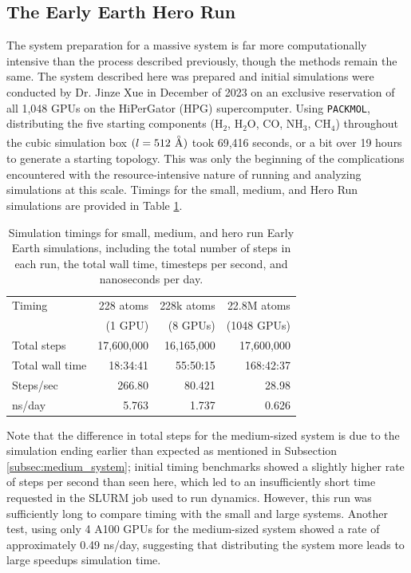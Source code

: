 \subsection{The Early Earth Hero Run}
\label{subsec:hero_run_simulation}

The system preparation for a massive system is far more computationally intensive than the process described previously, though the methods remain the same.
The system described here was prepared and initial simulations were conducted by Dr. Jinze Xue in December of 2023 on an exclusive reservation of all 1,048 GPUs on the HiPerGator (HPG) supercomputer.
Using \verb|PACKMOL|, distributing the five starting components ($\text{H}_2$, $\text{H}_2\text{O}$, CO, $\text{NH}_3$, $\text{CH}_4$) throughout the cubic simulation box $(l=512 \ \angstrom)$ took 69,416 seconds, or a bit over 19 hours to generate a starting topology.
This was only the beginning of the complications encountered with the resource-intensive nature of running and analyzing simulations at this scale. 
Timings for the small, medium, and Hero Run simulations are provided in Table \ref{tbl:md_timings}.

\begin{table}[h!]
\centering
\caption[Simulation timings for small, medium, and hero run simulations]{Simulation timings for small, medium, and hero run Early Earth simulations, including the total number of steps in each run, the total wall time, timesteps per second, and nanoseconds per day.
}\label{tbl:md_timings}
\begin{tabularx}{0.625\textwidth}{lrrr}  
\toprule
Timing & 228 atoms & 228k atoms & 22.8M atoms \\
 & (1 GPU) & (8 GPUs) & (1048 GPUs) \\
\midrule
Total steps & 17,600,000 & 16,165,000 & 17,600,000 \\
Total wall time & 18:34:41 & 55:50:15 & 168:42:37 \\
Steps/sec & 266.80 & 80.421 & 28.98 \\
ns/day & 5.763 & 1.737 & 0.626 \\
\bottomrule
\end{tabularx}
\end{table}

Note that the difference in total steps for the medium-sized system is due to the simulation ending earlier than expected as mentioned in Subsection \ref{subsec:medium_system}; initial timing benchmarks showed a slightly higher rate of steps per second than seen here, which led to an insufficiently short time requested in the SLURM job used to run dynamics.
However, this run was sufficiently long to compare timing with the small and large systems.
Another test, using only 4 A100 GPUs for the medium-sized system showed a rate of approximately 0.49 ns/day, suggesting that distributing the system more leads to large speedups simulation time. 

